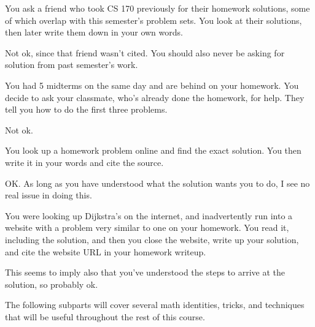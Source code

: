 \documentclass[11pt]{article}
\begin{document}
\begin{subparts}
\subpart You ask a friend who took CS 170 previously for their homework solutions, 
some of which overlap with this semester's problem sets. 
You look at their solutions, then later write them down in your own words.

\begin{solution}
	Not ok, since that friend wasn't cited. You should also never be asking for solution from past semester's work.
\end{solution}
\subpart You had 5 midterms on the same day and are behind on your homework. 
You decide to ask your classmate, who's already done the homework, for help. 
They tell you how to do the first three problems.

\begin{solution}
	Not ok. 
\end{solution}
\subpart You look up a homework problem online and find the exact solution. 
You then write it in your words and cite the source.

\begin{solution}
	OK. As long as you have understood what the solution wants you to do, I see no real issue in doing this. 
\end{solution}

\subpart You were looking up Dijkstra's on the internet, and inadvertently run into a website with a problem very similar to one on your homework. 
You read it, including the solution, and then you close the website, 
write up your solution, and cite the website URL in your homework writeup.

\begin{solution}
	This seems to imply also that you've understood the steps to arrive at the solution, so probably ok. 
\end{solution}

\end{subparts}
\pagebreak
{}

The following subparts will cover several math identities, tricks, and techniques that will be useful throughout the rest of this course.
\end{document}
